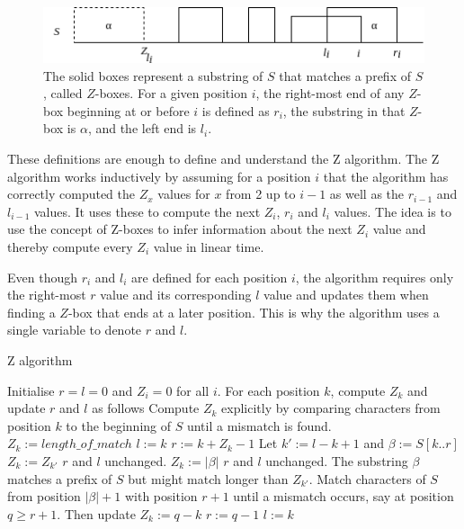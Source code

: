 \begin{figure}[t]
    \centering
    \includegraphics[width=.9\textwidth]{LaTeX/Figures/Zalg/zboxes.png}
    \caption{The solid boxes represent a substring of $S$ that matches a prefix of $S$, called $Z$-boxes. For a given position $i$, the right-most end of any $Z$-box beginning at or before $i$ is defined as $r_i$, the substring in that $Z$-box is $\alpha$, and the left end is $l_i$. }
    \label{fig:z_boxes}
\end{figure}

These definitions are enough to define and understand the Z algorithm. The Z algorithm works inductively by assuming for a position $i$ that the algorithm has correctly computed the $Z_x$ values for $x$ from 2 up to $i-1$ as well as the $r_{i-1}$ and $l_{i-1}$ values. It uses these to compute the next $Z_i$, $r_i$ and $l_i$ values. The idea is to use the concept of Z-boxes to infer information about the next $Z_i$ value and thereby compute every $Z_i$ value in linear time. 

Even though $r_i$ and $l_i$ are defined for each position $i$, the algorithm requires only the right-most $r$ value and its corresponding $l$ value and updates them when finding a $Z$-box that ends at a later position. This is why the algorithm uses a single variable to denote $r$ and $l$. 

\begin{algorithm}
\caption{Z algorithm}\label{alg:z_alg}
\begin{algorithmic}
\State Initialise $r=l=0$ and $Z_i=0$ for all $i$. 
\State For each position $k$, compute $Z_k$ and update $r$ and $l$ as follows
 
    \State Compute $Z_k$ explicitly by comparing characters from position $k$ to the \State beginning of $S$ until a mismatch is found. 
    \State $Z_k:=length\_of\_match$
    \State $l:=k$
    \State $r:=k+Z_k-1$
    \State Let $k':=l-k+1$ and $\beta:=S[k..r]$
     
        \State $Z_k:=Z_{k'}$
        \State $r$ and $l$ unchanged. 
     
        \State $Z_k:=|\beta|$
        \State $r$ and $l$ unchanged. 
     
        \State The substring $\beta$ matches a prefix of $S$ but might match longer than $Z_{k'}$. \State Match characters of $S$ from position $|\beta|+1$ with position $r+1$ until a \State mismatch occurs, say at position $q\geq r+1$. Then update
        \State $Z_k:=q-k$
        \State $r:=q-1$
        \State $l:=k$
    \EndIf
\EndIf
\EndFor
\end{algorithmic}
\end{algorithm}


